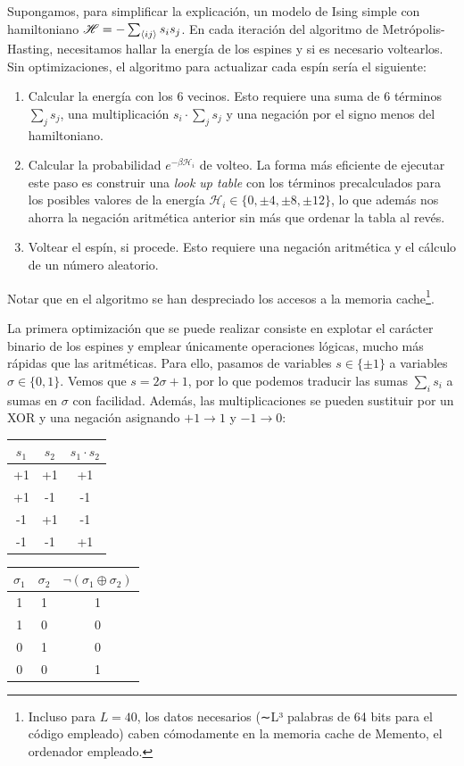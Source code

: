 \documentclass[11pt]{report}
\newcommand{\Ham}{\mathscr{H}}
\begin{document}
\begin{appendices}
Supongamos, para simplificar la explicación, un modelo de Ising simple
con hamiltoniano $\Ham = - \sum_{\expval{ij}}s_is_j$.
En cada iteración del algoritmo de Metrópolis-Hasting, necesitamos hallar
la energía de los espines y si es necesario voltearlos. Sin
optimizaciones, el algoritmo para actualizar cada espín sería el siguiente:
\begin{enumerate}
\item Calcular la energía con los 6 vecinos. Esto requiere una suma de
  6 términos $\sum_{j}s_j$, una multiplicación $s_i ⋅ \sum_{j}s_j$ y
  una negación por el signo menos del hamiltoniano.
\item Calcular la probabilidad $e^{-β \Ham_i}$ de volteo. La forma más
  eficiente de ejecutar este paso es construir una \textit{look up
    table} con los términos precalculados para los posibles valores de
  la energía $\Ham_i ∈ \{0,±4,±8,±12\}$, lo que además nos ahorra la
  negación aritmética anterior sin más que ordenar la tabla al revés.
\item Voltear el espín, si procede. Esto requiere una negación
  aritmética y el cálculo de un número aleatorio.
\end{enumerate}
Notar que en el algoritmo se han despreciado los accesos a la memoria
cache\footnote{Incluso para $L=40$, los datos necesarios (∼L³
  palabras de 64 bits para el código empleado) caben cómodamente en la
  memoria cache de Memento, el ordenador empleado.}.

La primera optimización que se puede realizar consiste en explotar el
carácter binario de los espines y emplear únicamente operaciones lógicas,
mucho más rápidas que las aritméticas. Para ello, pasamos de variables
$s∈\{±1\}$ a variables $σ∈\{0,1\}$. Vemos que $s=2σ+1$, por lo que
podemos traducir las sumas $\sum_{i}s_i$ a sumas en $σ$ con
facilidad. Además, las multiplicaciones se pueden sustituir por un
XOR y una negación asignando $+1→1$ y $-1→0$:
\begin{center}
  \begin{tabular}{cc|c}
    $s_1$ & $s_2$ & $s_1⋅s_2$ \\ \hline
    +1    & +1    &  +1 \\
    +1    & -1    &  -1 \\
    -1    & +1    &  -1 \\
    -1    & -1    &  +1 \\
  \end{tabular}
  \qquad
  \begin{tabular}{cc|c}
    $σ_1$ & $σ_2$ & $¬(σ_1⊕σ_2)$ \\ \hline
    1     & 1     & 1 \\
    1     & 0     & 0 \\
    0     & 1     & 0 \\
    0     & 0     & 1 \\
  \end{tabular}
\end{center}


\end{appendices}
\end{document}
